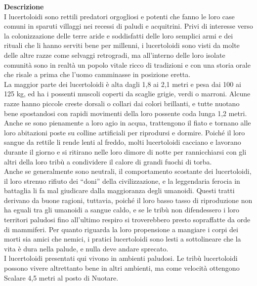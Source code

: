 \begin{multicols}{2}
\textbf{Descrizione}\\
I lucertoloidi sono rettili predatori orgogliosi e potenti che fanno le loro case comuni in sparuti villaggi nei recessi di paludi e acquitrini. Privi di interesse verso la colonizzazione delle terre aride e soddisfatti delle loro semplici armi e dei rituali che li hanno serviti bene per millenni, i lucertoloidi sono visti da molte delle altre razze come selvaggi retrogradi, ma all'interno delle loro isolate comunità sono in realtà un popolo vitale ricco di tradizioni e con una storia orale che risale a prima che l'uomo camminasse in posizione eretta.\\

La maggior parte dei lucertoloidi è alta dagli 1,8 ai 2,1 metri e pesa dai 100 ai 125 kg, ed ha i possenti muscoli coperti da scaglie grigie, verdi o marroni. Alcune razze hanno piccole creste dorsali o collari dai colori brillanti, e tutte nuotano bene spostandosi con rapidi movimenti della loro possente coda lunga 1,2 metri. Anche se sono pienamente a loro agio in acqua, trattengono il fiato e tornano alle loro abitazioni poste su colline artificiali per riprodursi e dormire. Poiché il loro sangue da rettile li rende lenti al freddo, molti lucertoloidi cacciano e lavorano durante il giorno e si ritirano nelle loro dimore di notte per rannicchiarsi con gli altri della loro tribù a condividere il calore di grandi fuochi di torba.\\

Anche se generalmente sono neutrali, il comportamento scostante dei lucertoloidi, il loro strenuo rifiuto dei “doni” della civilizzazione, e la leggendaria ferocia in battaglia li fa mal giudicare dalla maggioranza degli umanoidi. Questi tratti derivano da buone ragioni, tuttavia, poiché il loro basso tasso di riproduzione non ha eguali tra gli umanoidi a sangue caldo, e se le tribù non difendessero i loro territori paludosi fino all'ultimo respiro si troverebbero presto sopraffatte da orde di mammiferi. Per quanto riguarda la loro propensione a mangiare i corpi dei morti sia amici che nemici, i pratici lucertoloidi sono lesti a sottolineare che la vita è dura nella palude, e nulla deve andare sprecato.\\

I lucertoloidi presentati qui vivono in ambienti paludosi. Le tribù lucertoloidi possono vivere altrettanto bene in altri ambienti, ma come velocità ottengono Scalare 4,5 metri al posto di Nuotare.\\



\end{multicols}
